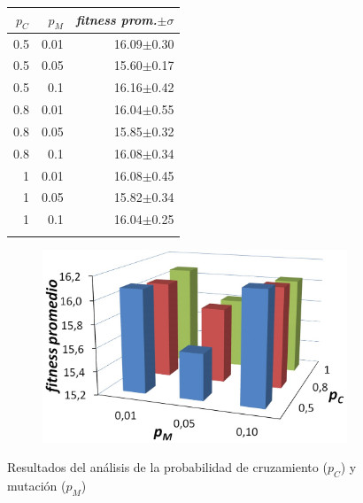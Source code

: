 \begin{figure}[H]
\begin{minipage}[t]{0.4\linewidth}
\begin{table}[H]
	\renewcommand{\arraystretch}{1.0}
\renewcommand{\tabcolsep}{4pt}
	\centering
	\begin{tabular}{rrr}
		\toprule
		$p_C$&
		$p_M$ &
		\textit{fitness prom.$\pm \sigma$}\\
		\midrule
		0.5 & 0.01  &  16.09$\pm$0.30\\
		0.5 & 0.05 &  15.60$\pm$0.17\\
		0.5 & 0.1  &  16.16$\pm$0.42\\
		0.8 & 0.01  &  16.04$\pm$0.55\\
		0.8 & 0.05  &  15.85$\pm$0.32\\
		0.8 & 0.1  &  16.08$\pm$0.34\\
		1 & 0.01 &  16.08$\pm$0.45\\
		1 & 0.05 &  15.82$\pm$0.34\\
		1 & 0.1 &  16.04$\pm$0.25\\
		\bottomrule
\\[-9pt]
	\end{tabular}
\end{table}
\end{minipage}
\begin{minipage}[t]{0.6\linewidth}
\begin{figure}[H]
	\centering
	\includegraphics[width=1.0\linewidth]{Figures/grafica_mutacion_cruzamiento}
	\label{fig:grafica_mutacion_cruzamiento}
\end{figure}
\end{minipage}
	\caption{Resultados 
del análisis de la probabilidad de cruzamiento ($p_C$) y mutación ($p_M$)}
	\label{table:parametro_mutacion_cruzamiento}
\end{figure}
 
